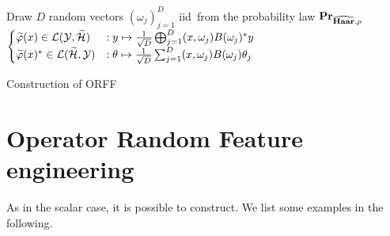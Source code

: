 \begin{center}
    \begin{algorithm2e}\label{alg:ORFF2_construction}
        \SetAlgoLined
        \BlankLine
        Draw $D$ random vectors $(\omega_j)_{j=1}^D$ \ac{iid}~from the
        probability law ${\mathbf{{Pr}}}_{\widehat{\mathbf{Haar}},\rho}$\;
        \Return $
        \begin{cases}
            \tildePhi{\omega}(x) \in\mathcal{L}(\mathcal{Y}, \tildeH{\omega})
            &: y \mapsto \frac{1}{\sqrt{D}}\Vect_{j=1}^D\pairing{x,
            \omega_j}B(\omega_j)^\adjoint y \\ 
            \tildePhi{\omega}(x)^\adjoint \in\mathcal{L}(\tildeH{\omega},
            \mathcal{Y}) &: \theta \mapsto \frac{1}{\sqrt{D}} \sum_{j=1}^D
            \pairing{x, \omega_j}B(\omega_j)\theta_j
        \end{cases}$\;
        \caption{Construction of \acs{ORFF}}
    \end{algorithm2e}
\end{center}
\section{Operator Random Feature engineering}
As in the scalar case, it is possible to construct. We list some examples in
the following.

